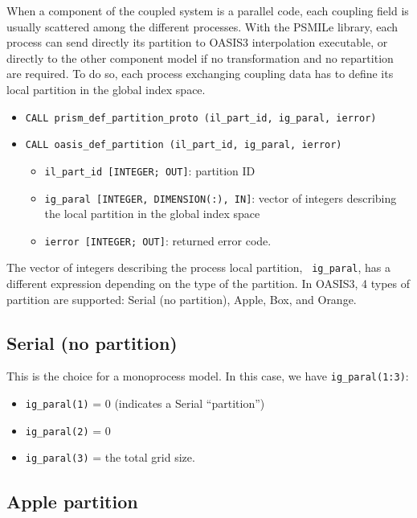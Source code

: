 When a component of the coupled system is a parallel code, each
coupling field is usually scattered among the different
processes. With the PSMILe library, each process can send
directly its partition to OASIS3 interpolation executable, or directly to the
other component model if no transformation and no repartition are
required.  To do so, each process exchanging coupling data has to
define its local partition in the global index space.

\begin{itemize}


\item {\tt CALL prism\_def\_partition\_proto (il\_part\_id, ig\_paral, ierror)}
\item {\tt CALL oasis\_def\_partition        (il\_part\_id, ig\_paral, ierror)}

   \begin{itemize}
   \item {\tt il\_part\_id [INTEGER; OUT]}: partition ID 
   \item {\tt ig\_paral [INTEGER, DIMENSION(:), IN]}: vector of
   integers describing the local partition in the global index space
   \item {\tt ierror [INTEGER; OUT]}: returned error code.
   \end{itemize}
\end{itemize} 

The vector of integers describing the process local partition, {\tt
ig\_paral}, has a different expression depending on the type of the
partition. In OASIS3, 4 types of partition are supported: Serial (no
partition), Apple, Box, and Orange.
 
\subsection{Serial (no partition)}

This is the choice for a monoprocess model. In this case, we have 
{\tt ig\_paral(1:3)}:
\begin{itemize}
 \item {\tt ig\_paral(1)} = 0 (indicates a Serial ``partition'')
 \item {\tt ig\_paral(2)} = 0
 \item {\tt ig\_paral(3)} = the total grid size.
\end{itemize}

\subsection{Apple partition} 

